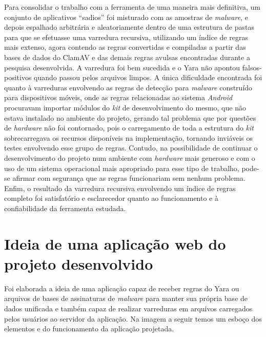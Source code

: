 Para consolidar o trabalho com a ferramenta de uma maneira mais definitiva, um
conjunto de aplicativos ``sadios'' foi misturado com as amostras de
\textit{malware}, e depois espalhado arbitrária e aleatoriamente dentro de uma
estrutura de pastas para que se efetuasse uma varredura recursiva, utilizando um
índice de regras mais extenso, agora contendo as regras convertidas e compiladas
a partir das bases de dados do ClamAV e das demais regras avulsas encontradas
durante a pesquisa desenvolvida. A varredura foi bem sucedida e o Yara não
apontou falsos-positivos quando passou pelos arquivos limpos. A única
dificuldade encontrada foi quanto à varreduras envolvendo as regras de detecção
para \textit{malware} construído para dispositivos móveis, onde as regras
relacionadas ao sistema \textit{Android} procuravam importar módulos do
\textit{kit} de desenvolvimento do mesmo, que não estava instalado no ambiente
do projeto, gerando tal problema que por questões de \textit{hardware} não foi
contornado, pois o carregamento de toda a estrutura do \textit{kit}
sobrecarregava os recursos disponíveis na implementação,  tornando inviáveis os
testes envolvendo esse grupo de regras. Contudo, na possibilidade de continuar o
desenvolvimento do projeto num ambiente com \textit{hardware} mais generoso e
com o uso de um sistema operacional mais apropriado para esse tipo de trabalho,
pode-se afirmar com segurança que as regras funcionariam sem nenhum problema.
Enfim, o resultado da varredura recursiva envolvendo um índice de regras
completo foi satisfatório e  esclarecedor quanto ao funcionamento e à
confiabilidade da ferramenta estudada.

\section{Ideia de uma aplicação web do projeto desenvolvido}
\label{s.prototipo}

Foi elaborada a ideia de uma aplicação capaz de receber regras do Yara ou
arquivos de bases de assinaturas de \textit{malware} para manter sua própria
base de dados unificada e também capaz de realizar varreduras em arquivos
carregados pelos usuários ao servidor da aplicação. Na imagem a seguir temos um
esboço dos elementos e do funcionamento da aplicação projetada.


